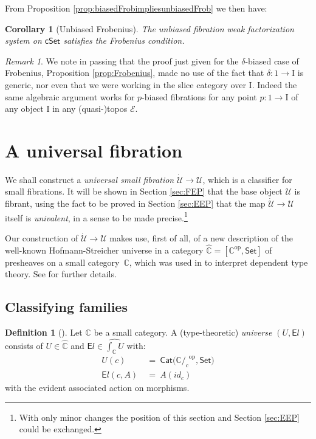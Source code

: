 \documentclass[11pt]{amsart}
\newcommand{\bbC}{\ensuremath{\mathbb{C}}}
\newcommand{\EE}{\ensuremath{\mathcal{E}}}
\newcommand{\Set}{\ensuremath{\mathsf{Set}}}
\newcommand{\Cat}{\ensuremath{\mathsf{Cat}}}
\newcommand{\cSet}{\ensuremath{\mathsf{cSet}}}
\newcommand{\op}[1]{\ensuremath{{#1}^{\mathrm{op}}}}
\newcommand{\ra}{\ensuremath{\rightarrow}}
\renewcommand{\to}{\ensuremath{\rightarrow}}
\newcommand{\I}{\ensuremath{\mathrm{I}}}
\newcommand{\U}{\ensuremath{\mathcal{U}}}
\newtheorem{corollary}[theorem]{Corollary}
\theoremstyle{remark}
\newtheorem{remark}[theorem]{Remark}
\theoremstyle{definition}
\newtheorem{definition}[theorem]{Definition}
\begin{document}
From Proposition \ref{prop:biasedFrobimpliesunbiasedFrob} we then have:

\begin{corollary}[Unbiased Frobenius]\label{cor:unbiasedFrobenius}
The unbiased fibration weak factorization system on $\cSet$ satisfies the Frobenius condition.
\end{corollary}

\begin{remark}\label{remark:unbiasedFrobeniusgeneralizes}
We note in passing that the proof just given for the $\delta$-biased case of Frobenius, Proposition \ref{prop:Frobenius}, made no use of the fact that $\delta : 1\to\I$ is generic, nor even that we were working in the slice category over $\I$.  Indeed the same algebraic argument works for $p$-biased fibrations for any point $p : 1\to\I$ of any object $\I$ in any (quasi-)topos $\EE$.
\end{remark}

\section{A universal fibration}\label{sec:U}

We shall construct a \emph{universal small fibration} $\dot{\U}\ra \U$, which is a classifier for small fibrations.  It will be shown in Section \ref{sec:FEP} that the base object $\U$ is fibrant, using the fact to be proved in Section \ref{sec:EEP} that the map $\dot{\U}\ra \U$ itself is \emph{univalent}, in a sense to be made precise.\footnote{With only minor changes the position of this section and Section \ref{sec:EEP} could be exchanged.}  

Our construction of $\dot{\U}\ra \U$ makes use, first of all, of a new description of the well-known Hofmann-Streicher universe in a category $\widehat{\bbC} = [\op{\bbC}, \Set]$ of presheaves on a small category~$\bbC$, which was used in \cite{HS:1997} to interpret dependent type theory. See \cite{awodey:HSuniverse} for further details. 

\subsection{Classifying families}\label{sec:Ufam}

\begin{definition}[\cite{HS:1997}]\label{def:HSuniverse}
Let $\bbC$ be a small category.  A (type-theoretic) \emph{universe}  $(U, {\mathsf{E}l})$  consists of 
$U\in\widehat{\bbC}$ and $\textstyle{\mathsf{E}l} \in \widehat{\int_\bbC U}$ with: 
 \begin{align}
	U(c)\ &=\ \Cat\big(\op{\bbC/_c}, \Set\big) \label{eq:universeob}\\ 
 	{\mathsf{E}l}(c, A)\ &=\ A(id_c) \label{eq:universeel}
 \end{align}
with the evident associated action on morphisms.  
\end{definition}
\end{document}

